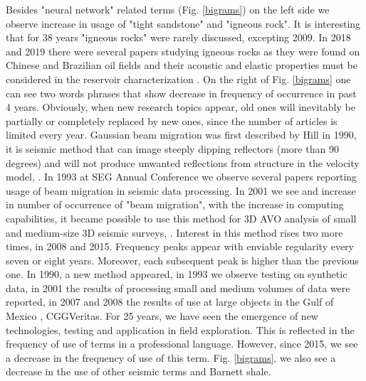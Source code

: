 \documentclass[geosciences,article,submit,moreauthors,pdftex]{Definitions/mdpi}
\begin{document}
Besides "neural network" related terms (Fig. \ref{bigrams}) on the left side we observe increase in usage of "tight sandstone" and "igneous rock". It is interesting that for 38 years "igneous rocks" were rarely discussed, excepting 2009. In 2018 and 2019 there were several papers studying igneous rocks as they were found on Chinese and Brazilian oil fields and their acoustic and elastic properties must be considered in the reservoir characterization \citep{Penna2019}. On the right of Fig. \ref{bigrams} one can see two words phrases that show decrease in frequency of occurrence in past 4 years. Obviously, when new research topics appear, old ones will inevitably be partially or completely replaced by new ones, since the number of articles is limited every year. Gaussian beam migration was first described by Hill in 1990, it is seismic method that can image steeply dipping reflectors (more than 90 degrees) and will not produce unwanted reflections from structure in the velocity model, \citep{Hill1990}. In 1993 at SEG Annual Conference we observe several papers reporting usage of beam migration in seismic data processing. In 2001 we see and increase in number of occurrence of "beam migration", with the increase in computing capabilities, it became possible to use this method for 3D AVO analysis of small and medium-size 3D seismic surveys, \citep{Huang2001}. Interest in this method rises two more times, in 2008 and 2015. Frequency peaks appear with enviable regularity every seven or eight years. Moreover, each subsequent peak is higher than the previous one. In 1990, a new method appeared, in 1993 we observe testing on synthetic data, in 2001 the results of processing small and medium volumes of data were reported, in 2007 and 2008 the results of use at large objects in the Gulf of Mexico \citep{Ting2008}, CGGVeritas. For 25 years, we have seen the emergence of new technologies, testing and application in field exploration. This is reflected in the frequency of use of terms in a professional language. However, since 2015, we see a decrease in the frequency of use of this term. Fig. \ref{bigrams}, we also see a decrease in the use of other seismic terms and Barnett shale.
\end{document}
